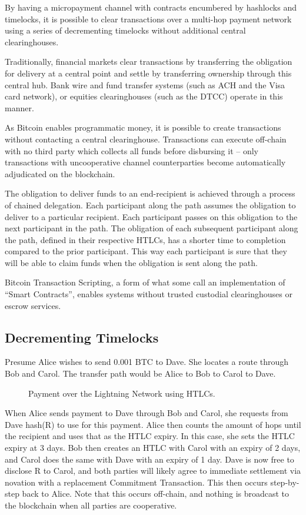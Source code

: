 \documentclass[letterpaper,11pt]{article}
\begin{document}
By having a micropayment channel with contracts encumbered by hashlocks and
timelocks, it is possible to clear transactions over a multi-hop payment
network using a series of decrementing timelocks without additional central
clearinghouses.

Traditionally, financial markets clear transactions by transferring the
obligation for delivery at a central point and settle by transferring ownership
through this central hub. Bank wire and fund transfer systems (such as ACH and
the Visa card network), or equities clearinghouses (such as the DTCC) operate
in this manner.

As Bitcoin enables programmatic money, it is possible to create transactions
without contacting a central clearinghouse. Transactions can execute off-chain
with no third party which collects all funds before disbursing it -- only
transactions with uncooperative channel counterparties become automatically
adjudicated on the blockchain. 

The obligation to deliver funds to an end-recipient is achieved through a
process of chained delegation. Each participant along the path assumes the
obligation to deliver to a particular recipient. Each participant passes on this
obligation to the next participant in the path. The obligation of each
subsequent participant along the path, defined in their respective HTLCs, has a
shorter time to completion compared to the prior participant. This way each
participant is sure that they will be able to claim funds when the obligation is
sent along the path.

Bitcoin Transaction Scripting, a form of what some call an implementation of
``Smart Contracts''\cite{smartcontracts}, enables systems without trusted
custodial clearinghouses or escrow services.

\subsection{Decrementing Timelocks}

Presume Alice wishes to send 0.001 BTC to Dave. She locates a route through Bob
and Carol. The transfer path would be Alice to Bob to Carol to Dave.

\begin{figure}[H]
	\caption{Payment over the Lightning Network using HTLCs.
	}
\end{figure}

When Alice sends payment to Dave through Bob and Carol, she requests from Dave
hash(R) to use for this payment. Alice then counts the amount of hops until the
recipient and uses that as the HTLC expiry. In this case, she sets the HTLC
expiry at 3 days. Bob then creates an HTLC with Carol with an expiry of 2 days,
and Carol does the same with Dave with an expiry of 1 day. Dave is now free to
disclose R to Carol, and both parties will likely agree to immediate settlement
via novation with a replacement Commitment Transaction. This then occurs
step-by-step back to Alice. Note that this occurs off-chain, and nothing is
broadcast to the blockchain when all parties are cooperative.
\end{document}

